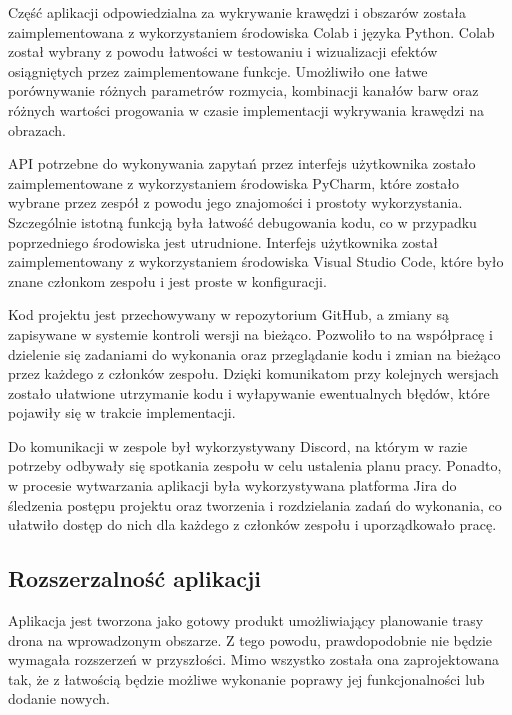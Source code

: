 Część aplikacji odpowiedzialna za wykrywanie krawędzi i obszarów została zaimplementowana z wykorzystaniem środowiska Colab i języka Python. Colab został wybrany z powodu łatwości w testowaniu i wizualizacji efektów osiągniętych przez zaimplementowane funkcje. Umożliwiło one łatwe porównywanie różnych parametrów rozmycia, kombinacji kanałów barw oraz różnych wartości progowania w czasie implementacji wykrywania krawędzi na obrazach.

API potrzebne do wykonywania zapytań przez interfejs użytkownika zostało zaimplementowane z wykorzystaniem środowiska PyCharm, które zostało wybrane przez zespół z powodu jego znajomości i prostoty wykorzystania. Szczególnie istotną funkcją była łatwość debugowania kodu, co w przypadku poprzedniego środowiska jest utrudnione.
Interfejs użytkownika został zaimplementowany z wykorzystaniem środowiska Visual Studio Code, które było znane członkom zespołu i jest proste w konfiguracji.

Kod projektu jest przechowywany w repozytorium GitHub, a zmiany są zapisywane w systemie kontroli wersji na bieżąco. Pozwoliło to na współpracę i dzielenie się zadaniami do wykonania oraz przeglądanie kodu i zmian na bieżąco przez każdego z członków zespołu. Dzięki komunikatom przy kolejnych wersjach zostało ułatwione utrzymanie kodu i wyłapywanie ewentualnych błędów, które pojawiły się w trakcie implementacji.

Do komunikacji w zespole był wykorzystywany Discord, na którym w razie potrzeby odbywały się spotkania zespołu w celu ustalenia planu pracy. Ponadto, w procesie wytwarzania aplikacji była wykorzystywana platforma Jira do śledzenia postępu projektu oraz tworzenia i rozdzielania zadań do wykonania, co ułatwiło dostęp do nich dla każdego z członków zespołu i uporządkowało pracę.

\subsection{Rozszerzalność aplikacji}

Aplikacja jest tworzona jako gotowy produkt umożliwiający planowanie trasy drona na wprowadzonym obszarze. Z tego powodu, prawdopodobnie nie będzie wymagała rozszerzeń w przyszłości. Mimo wszystko została ona zaprojektowana tak, że z łatwością będzie możliwe wykonanie poprawy jej funkcjonalności lub dodanie nowych.
